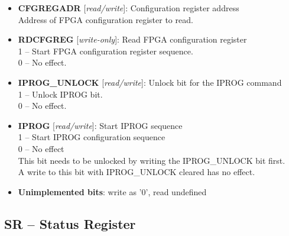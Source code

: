 \begin{itemize}
\item \begin{small}
{\bf 
CFGREGADR
} [\emph{read/write}]: Configuration register address
\\
Address of FPGA configuration register to read.
\end{small}
\item \begin{small}
{\bf 
RDCFGREG
} [\emph{write-only}]: Read FPGA configuration register
\\
1 -- Start FPGA configuration register sequence. \\      0 -- No effect.
\end{small}
\item \begin{small}
{\bf 
IPROG\_UNLOCK
} [\emph{read/write}]: Unlock bit for the IPROG command
\\
1 -- Unlock IPROG bit. \\      0 -- No effect.
\end{small}
\item \begin{small}
{\bf 
IPROG
} [\emph{read/write}]: Start IPROG sequence
\\
1 -- Start IPROG configuration sequence \\      0 -- No effect \\      This bit needs to be unlocked by writing the IPROG\_UNLOCK bit first. \\      A write to this bit with IPROG\_UNLOCK cleared has no effect.
\end{small}
\item \begin{small}
\textbf{Unimplemented bits}: write as '0', read undefined
\end{small}
\end{itemize}
\vspace{11pt}
\subsection{SR -- Status Register}
\label{app:memmap-sr}

